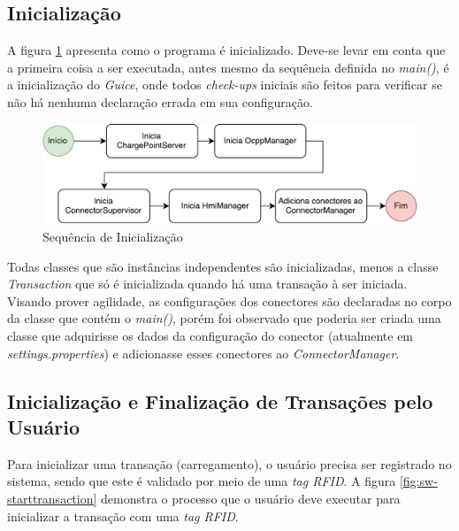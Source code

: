     \subsection{Inicialização}

      A figura \ref{fig:sw-init} apresenta como o programa é inicializado. Deve-se levar em conta que a primeira coisa a ser executada, antes mesmo da sequência definida no \textit{main()}, é a inicialização do \textit{Guice}, onde todos \textit{check-ups} iniciais são feitos para verificar se não há nenhuma declaração errada em sua configuração.

      \begin{figure}[H]
        \begin{center}
          \includegraphics[width=\textwidth]{assets/pdfs/sw-init.pdf}
          \caption{Sequência de Inicialização}
          \label{fig:sw-init}
        \end{center}
      \end{figure}

      Todas classes que são instâncias independentes são inicializadas, menos a classe \textit{Transaction} que só é inicializada quando há uma transação à ser iniciada. Visando prover agilidade, as configurações dos conectores são declaradas no corpo da classe que contém o \textit{main()}, porém foi observado que poderia ser criada uma classe que adquirisse os dados da configuração do conector (atualmente em \textit{settings.properties}) e adicionasse esses conectores ao \textit{ConnectorManager}.

    \subsection{Inicialização e Finalização de Transações pelo Usuário}

      Para inicializar uma transação (carregamento), o usuário precisa ser registrado no sistema, sendo que este é validado por meio de uma \textit{tag \ac{RFID}}. A figura \ref{fig:sw-starttransaction} demonstra o processo que o usuário deve executar para inicializar a transação com uma \textit{tag RFID}.

